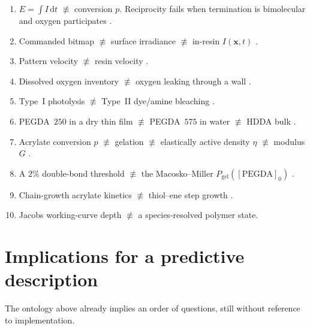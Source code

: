 \begin{enumerate}
  \item $E=\int I\,\mathrm{d}t$ $\not\equiv$ conversion $p$. Reciprocity fails when termination is bimolecular and oxygen participates \citep{Wydra2014,Lin2019}.
  \item Commanded bitmap $\not\equiv$ surface irradiance $\not\equiv$ in-resin $I(\mathbf{x},t)$ \citep{Meenakshisundaram2020,Montgomery2022}.
  \item Pattern velocity $\not\equiv$ resin velocity \citep{Meenakshisundaram2020,Slutzky2019}.
  \item Dissolved oxygen inventory $\not\equiv$ oxygen leaking through a wall \citep{Slutzky2019,Dendukuri2008}.
  \item Type~I photolysis $\not\equiv$ Type~II dye/amine bleaching \citep{Dadashi2016,Zhu2020,Montgomery2022}.
  \item PEGDA~$250$ in a dry thin film $\not\equiv$ PEGDA~$575$ in water $\not\equiv$ HDDA bulk \citep{Montgomery2022,Zhu2020,Dobson2024}.
  \item Acrylate conversion $p$ $\not\equiv$ gelation $\not\equiv$ elastically active density $\eta$ $\not\equiv$ modulus $G$ \citep{Zhu2020,Flory1941,Zhong2016}.
  \item A $2\%$ double-bond threshold \citep{Slutzky2019} $\not\equiv$ the Macosko--Miller $P_{\mathrm{gel}}([\mathrm{PEGDA}]_0)$ \citep{Zhu2020}.
  \item Chain-growth acrylate kinetics $\not\equiv$ thiol--ene step growth \citep{Cramer2001}.
  \item Jacobs working-curve depth \citep{Jacobs1992book} $\not\equiv$ a species-resolved polymer state.
\end{enumerate}

\section{Implications for a predictive description}

The ontology above already implies an order of questions, still without reference to implementation.

